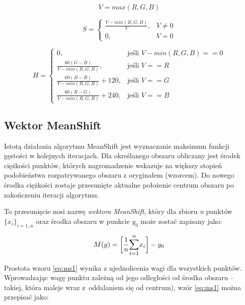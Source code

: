 \begin{equation}
\label{HSV_first}
V=max(R,G,B)
\end{equation}

\begin{equation}
S=\begin{cases}
\frac{V-min(R,G,B)}{V}, & V\neq0 \\
0, & V=0
\end{cases}
\end{equation}

\begin{equation}
\label{HSV_last}
H=\begin{cases}
	0, & \text{jeśli } V-min(R,G,B)==0 \\
	\frac{60(G-B)}{V-min(R,G,B)}, & \text{jeśli } V==R \\
	\frac{60(B-R)}{V-min(R,G,B)}+120, & \text{jeśli } V==G \\
	\frac{60(R-G)}{V-min(R,G,B)}+240, & \text{jeśli } V==B 
\end{cases}
\end{equation}


\subsection{Wektor MeanShift}
\label{ssec:MS}

Istotą działania algorytmu MeanShift jest wyznaczanie maksimum funkcji gęstości w kolejnych iteracjach. 
Dla określanego obszaru obliczany jest środek ciężkości punktów, których nagromadzenie wskazuje na większy stopień podobieństwa rozpatrywanego obszaru z oryginałem (wzorcem). 
Do nowego środka ciężkości zostaje przesunięte aktualne położenie centrum obszaru po zakończeniu iteracji algorytmu. %

To przesunięcie nosi nazwę \textit{wektora MeanShift}, który dla zbioru \textit{n} punktów $\{x_{i}\}_{i=1..n}$ oraz środka obszaru w punkcie $y_0$ może zostać zapisany jako:

\begin{equation}
\label{eq:ms1}
M(y)=\bigg[\frac{1}{n}\mathlarger{\sum\limits_{i=1}^{n}}x_i\bigg]-y_0
\end{equation}

Prostota wzoru \eqref{eq:ms1} wynika z ujednolicenia wagi dla wszystkich punktów. 
Wprowadzając wagę punktu zależną od jego odległości od środka obszaru -- takiej, która maleje wraz z~oddalaniem się od centrum), wzór \eqref{eq:ms1} można przepisać jako:

